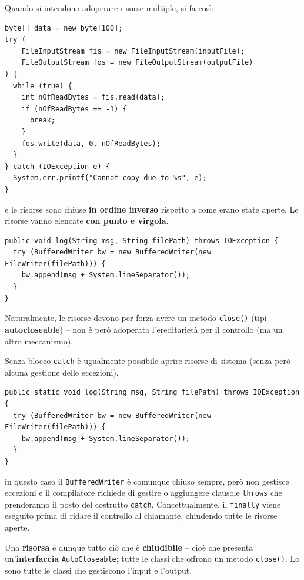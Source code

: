\documentclass[\fontsizeclass,twocolumn]{\classname}
\theoremstyle{definition}
\theoremstyle{definition}
\begin{document}
Quando si intendono adoperare risorse multiple, si fa così:

\begin{lstlisting}
byte[] data = new byte[100];
try (
    FileInputStream fis = new FileInputStream(inputFile);
    FileOutputStream fos = new FileOutputStream(outputFile)
) {
  while (true) {
    int nOfReadBytes = fis.read(data);
    if (nOfReadBytes == -1) {
      break;
    }
    fos.write(data, 0, nOfReadBytes);
  }
} catch (IOException e) {
  System.err.printf("Cannot copy due to %s", e);
}
\end{lstlisting}

e le risorse sono chiuse \textbf{in ordine inverso} rispetto a come erano state
aperte. Le risorse vanno elencate \textbf{con punto e virgola}.


\begin{lstlisting}
public void log(String msg, String filePath) throws IOException {
  try (BufferedWriter bw = new BufferedWriter(new FileWriter(filePath))) {
    bw.append(msg + System.lineSeparator());
  }
}
\end{lstlisting}

Naturalmente, le risorse devono per forza avere un metodo \texttt{close()}
(tipi \textbf{autocloseable}) -- non è però adoperata l'ereditarietà per il
controllo (ma un altro meccanismo).

Senza blocco \texttt{catch} è ugualmente possibile aprire risorse di sistema
(senza però alcuna gestione delle eccezioni),

\begin{lstlisting}
public static void log(String msg, String filePath) throws IOException {
  try (BufferedWriter bw = new BufferedWriter(new FileWriter(filePath))) {
    bw.append(msg + System.lineSeparator());
  }
}
\end{lstlisting}

in questo caso il \texttt{BufferedWriter} è comunque chiuso sempre, però non
gestisce eccezioni e il compilatore richiede di gestire o aggiungere clausole
\texttt{throws} che prenderanno il posto del costrutto \texttt{catch}.
Concettualmente, il \texttt{finally} viene eseguito prima di ridare il
controllo al chiamante, chiudendo tutte le risorse aperte.

Una \textbf{risorsa} è dunque tutto ciò che è \textbf{chiudibile} -- cioè che
presenta un'\textbf{interfaccia} \texttt{AutoCloseable}; tutte le classi che
offrono un metodo \texttt{close()}. Lo sono tutte le classi che gestiscono
l'input e l'output.
\end{document}
